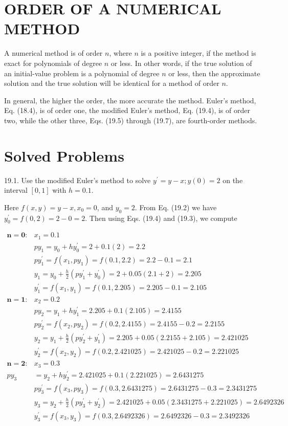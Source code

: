 \documentclass[10pt]{article}
\begin{document}
\section*{ORDER OF A NUMERICAL METHOD}
A numerical method is of order $n$, where $n$ is a positive integer, if the method is exact for polynomials of degree $n$ or less. In other words, if the true solution of an initial-value problem is a polynomial of degree $n$ or less, then the approximate solution and the true solution will be identical for a method of order $n$.

In general, the higher the order, the more accurate the method. Euler's method, Eq. (18.4), is of order one, the modified Euler's method, Eq. (19.4), is of order two, while the other three, Eqs. (19.5) through (19.7), are fourth-order methods.

\section*{Solved Problems}
19.1. Use the modified Euler's method to solve $y^{\prime}=y-x ; y(0)=2$ on the interval $[0,1]$ with $h=0.1$.

Here $f(x, y)=y-x, x_{0}=0$, and $y_{0}=2$. From Eq. (19.2) we have $y_{0}^{\prime}=f(0,2)=2-0=2$. Then using Eqs. (19.4) and (19.3), we compute

$$
\begin{array}{ll}
\mathbf{n = 0}: & x_{1}=0.1 \\
& p y_{1}=y_{0}+h y_{0}^{\prime}=2+0.1(2)=2.2 \\
& p y_{1}^{\prime}=f\left(x_{1}, p y_{1}\right)=f(0.1,2.2)=2.2-0.1=2.1 \\
& y_{1}=y_{0}+\frac{h}{2}\left(p y_{1}^{\prime}+y_{0}^{\prime}\right)=2+0.05(2.1+2)=2.205 \\
& y_{1}^{\prime}=f\left(x_{1}, y_{1}\right)=f(0.1,2.205)=2.205-0.1=2.105 \\
\mathbf{n = 1}: & x_{2}=0.2 \\
& p y_{2}=y_{1}+h y_{1}^{\prime}=2.205+0.1(2.105)=2.4155 \\
& p y_{2}^{\prime}=f\left(x_{2}, p y_{2}\right)=f(0.2,2.4155)=2.4155-0.2=2.2155 \\
& y_{2}=y_{1}+\frac{h}{2}\left(p y_{2}^{\prime}+y_{1}^{\prime}\right)=2.205+0.05(2.2155+2.105)=2.421025 \\
& y_{2}^{\prime}=f\left(x_{2}, y_{2}\right)=f(0.2,2.421025)=2.421025-0.2=2.221025 \\
\mathbf{n = 2 :} & x_{3}=0.3 \\
p y_{3} & =y_{2}+h y_{2}^{\prime}=2.421025+0.1(2.221025)=2.6431275 \\
& p y_{3}^{\prime}=f\left(x_{3}, p y_{3}\right)=f(0.3,2.6431275)=2.6431275-0.3=2.3431275 \\
& y_{3}=y_{2}+\frac{h}{2}\left(p y_{3}^{\prime}+y_{2}^{\prime}\right)=2.421025+0.05(2.3431275+2.221025)=2.6492326 \\
& y_{3}^{\prime}=f\left(x_{3}, y_{3}\right)=f(0.3,2.6492326)=2.6492326-0.3=2.3492326
\end{array}
$$
\end{document}
